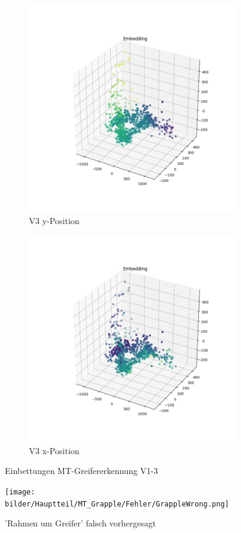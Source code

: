 \begin{figure}[h]
	\begin{subfigure}[c]{0.49\textwidth}			
		\includegraphics[width=1\textwidth,center]{bilder/Hauptteil/MT_Grapple/EMB_alle/3_Embedding_y.png}
		\caption{V3 y-Position}
		\label{img:Einbettung3_y}	
	\end{subfigure}
	\centering
	\begin{subfigure}[c]{0.49\textwidth}			
		\includegraphics[width=1\textwidth,center]{bilder/Hauptteil/MT_Grapple/EMB_alle/3_Embedding_x.png}
		\caption{V3 x-Position}
		\label{img:Einbettung3_x}		
	\end{subfigure}
	
	\caption{Einbettungen MT-Greifererkennung V1-3}
	\label{img:Einbettungen1-3}
\end{figure}

		\begin{figure}[h]
		\centering
		\texttt{[image: bilder/Hauptteil/MT\_Grapple/Fehler/GrappleWrong.png]}
		\caption{'Rahmen um Greifer' falsch vorhergesagt}
		\label{img:GrappleFalschVorhergesagt}
	\end{figure}
